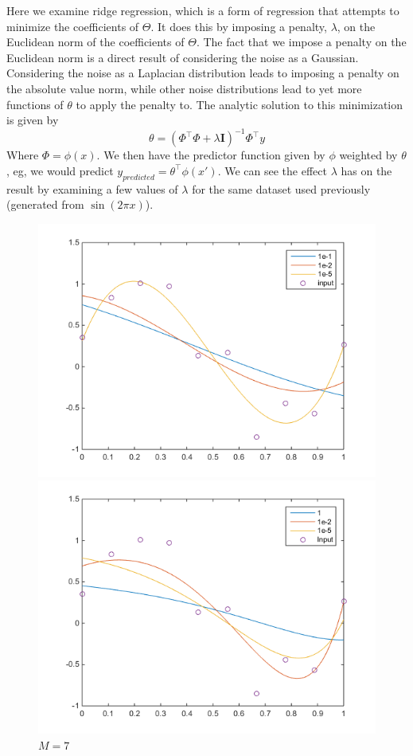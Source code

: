 \documentclass[11pt,letterpaper]{article}
\begin{document}
Here we examine ridge regression, which is a form of regression that attempts to minimize the coefficients of $\Theta$. It does this by imposing a penalty, $\lambda$, on the Euclidean norm of the coefficients of $\Theta$. The fact that we impose a penalty on the Euclidean norm is a direct result of considering the noise as a Gaussian. Considering the noise as a Laplacian distribution leads to imposing a penalty on the absolute value norm, while other noise distributions lead to yet more functions of $\theta$ to apply the penalty to. The analytic solution to this minimization is given by
\[ \theta = (\Phi^\intercal \Phi + \lambda \mathbf{I})^{-1}\Phi^\intercal y \]
Where $\Phi = \phi(x)$. We then have the predictor function given by $\phi$ weighted by $\theta$, eg, we would predict $y_{predicted} = \theta^\intercal \phi(x')$. We can see the effect $\lambda$ has on the result by examining a few values of $\lambda$ for the same dataset used previously (generated from $\sin(2\pi x)$).
\begin{figure}[!htb]
  \includegraphics[width=\linewidth]{figures/M3.png}
  \caption{$M=3$}\label{fig:M3}
\endminipage\hfill
{}
  \includegraphics[width=\linewidth]{figures/M7.png}
  \caption{$M=7$}\label{fig:M7}
\endminipage
\end{figure}
\end{document}
